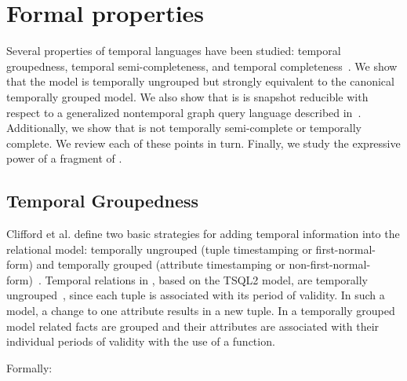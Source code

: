 \section{Formal \tga properties}
\label{sec:formal}

Several properties of temporal languages have been studied: temporal
groupedness, temporal semi-completeness, and temporal
completeness~\cite{Bohlen1995}.  We show that the \tg model is
temporally ungrouped but strongly equivalent to the canonical
temporally grouped model.  We also show that \tga is is snapshot
reducible with respect to a generalized nontemporal graph query
language described in~\cite{Wood2012}.  Additionally, we show that
\tga is not temporally semi-complete or temporally complete.  We
review each of these points in turn.  Finally, we study the expressive
power of a fragment of \tga.

\subsection{Temporal Groupedness}

Clifford et al. define two basic strategies for adding temporal
information into the relational model: temporally ungrouped (tuple
timestamping or first-normal-form) and temporally grouped (attribute
timestamping or non-first-normal-form)~\cite{Clifford1994}.  Temporal
relations in \tra, based on the TSQL2 model, are temporally
ungrouped~\cite{Bohlen1995}, since each tuple is associated with its
period of validity.  In such a model, a change to one attribute
results in a new tuple.  In a temporally grouped model related facts
are grouped and their attributes are associated with their individual
periods of validity with the use of a function.

Formally:

